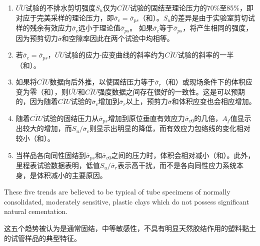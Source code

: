 \begin{paracol}{2}
    \switchcolumn

    \begin{enumerate}
        \item $\overline{UU}$试验的不排水剪切强度$S_u$仅为$\overline{CIU}$试验的固结至理论压力的70$\%$至85$\%$，即对应于完美采样的理论压力，即$\overline{\sigma}_c=\overline{\sigma}_{ps}$（和）。$S_u$的差异是由于实验室剪切试样的残余有效应力$\overline{\sigma}_c$远小于理论值$\overline{\sigma}_{ps}$。 如果$\overline{\sigma}_c$等于$\overline{\sigma}_{ps}$，将产生相同的强度，因为预剪切力$\overline{\sigma}$和空隙率因此在两个试验中均相等。
        \item 若$\overline{\sigma}_c=\overline{\sigma}_{ps}$，$\overline{UU}$试验的应力-应变曲线的斜率约为$\overline{CIU}$试验的斜率的一半（和）。
        \item 如果将$\overline{CIU}$数据向后外推，以使固结压力等于$\overline{\sigma}_r$（和）或现场条件下的体积应变为零（和），则$\overline{UU}$和$\overline{CIU}$强度数据之间存在很好的一致性。这是可以预期的，因为随着$\overline{CIU}$试验的$\overline{\sigma}_c$增加到$\overline{\sigma}_r$以上，预剪力$\overline{\sigma}$和体积应变也会相应增加。
        \item 随着$\overline{CIU}$试验的固结压力从$\overline{\sigma}_{ps}$增加到原位垂直有效应力$\overline{\sigma}_{v0}$的几倍，$A_f$值显示出较大的增加，而$S_u/\overline{\sigma}_c$则显示出明显的降低，而有效应力包络线的变化相对较小（和）。
        \item 当样品各向同性固结到$\overline{\sigma}_{ps}$和$\overline{\sigma}_{v0}$之间的压力时，体积会相对减小（和）。此外，里程表试验数据表明，低值$S_u/\overline{\sigma}_r$表示高干扰，而不是各向同性应力系统本身，是体积减小的主要原因。
    \end{enumerate}

    \switchcolumn*
    
    These five trends are believed to be typical of tube specimens of normally consolidated, moderately sensitive, plastic clays which do not possess significant natural cementation.

    \switchcolumn
    
    这五个趋势被认为是通常固结，中等敏感性，不具有明显天然胶结作用的塑料黏土的试管样品的典型特征。

    \switchcolumn*


\end{paracol}
